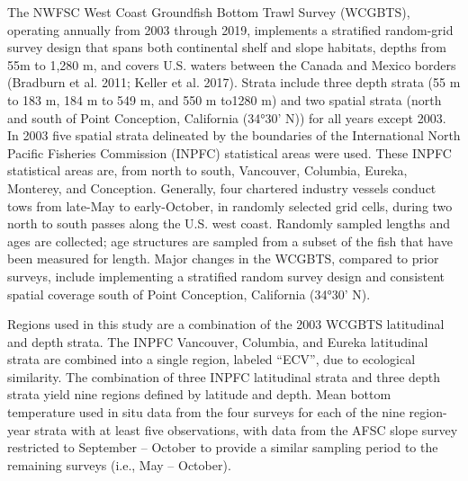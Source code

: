 \documentclass[
]{article}
\begin{document}
The NWFSC West Coast Groundfish Bottom Trawl Survey (WCGBTS), operating
annually from 2003 through 2019, implements a stratified random-grid
survey design that spans both continental shelf and slope habitats,
depths from 55m to 1,280 m, and covers U.S. waters between the Canada
and Mexico borders (Bradburn et al. 2011; Keller et al. 2017). Strata
include three depth strata (55 m to 183 m, 184 m to 549 m, and 550 m
to1280 m) and two spatial strata (north and south of Point Conception,
California (34°30' N)) for all years except 2003. In 2003 five spatial
strata delineated by the boundaries of the International North Pacific
Fisheries Commission (INPFC) statistical areas were used. These INPFC
statistical areas are, from north to south, Vancouver, Columbia, Eureka,
Monterey, and Conception. Generally, four chartered industry vessels
conduct tows from late-May to early-October, in randomly selected grid
cells, during two north to south passes along the U.S. west coast.
Randomly sampled lengths and ages are collected; age structures are
sampled from a subset of the fish that have been measured for length.
Major changes in the WCGBTS, compared to prior surveys, include
implementing a stratified random survey design and consistent spatial
coverage south of Point Conception, California (34°30' N).

Regions used in this study are a combination of the 2003 WCGBTS
latitudinal and depth strata. The INPFC Vancouver, Columbia, and Eureka
latitudinal strata are combined into a single region, labeled ``ECV'',
due to ecological similarity. The combination of three INPFC latitudinal
strata and three depth strata yield nine regions defined by latitude and
depth. Mean bottom temperature used in situ data from the four surveys
for each of the nine region-year strata with at least five observations,
with data from the AFSC slope survey restricted to September -- October
to provide a similar sampling period to the remaining surveys (i.e., May
-- October).
\end{document}
